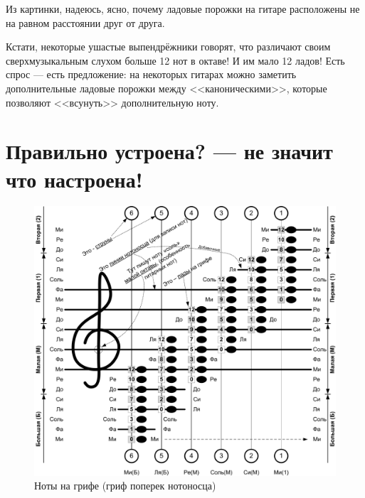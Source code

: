 Из картинки, надеюсь, ясно, почему ладовые порожки на гитаре расположены не на равном расстоянии друг от друга.

Кстати, некоторые ушастые выпендрёжники говорят, что различают своим сверхмузыкальным слухом больше 12 нот в октаве! И им мало 12 ладов! Есть спрос --- есть предложение: на некоторых гитарах можно заметить дополнительные ладовые порожки между <<каноническими>>, которые позволяют <<всунуть>> дополнительную ноту.


\section{Правильно устроена? --- не значит что настроена!}
\label{ch:guitar:tuning}

\begin{figure}[!ht]
    \centering
    \includegraphics[width=\textwidth]{fig/lad-by-notes} 
    \caption{Ноты на грифе (гриф поперек нотоносца)}\label{fig:guitar:lad-by-notes}
\end{figure} 

